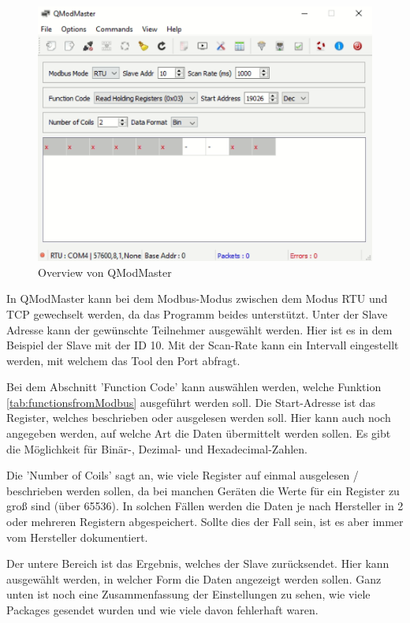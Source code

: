\begin{figure}[h t]
\centering
\includegraphics[scale=0.7]{pics/QmodMasterverview.png}
\caption{Overview von QModMaster }
\label{fig:impl:QmodMasterverview}
\end{figure}



In QModMaster kann bei dem Modbus-Modus zwischen dem Modus RTU und TCP gewechselt werden, da das Programm beides unterstützt. Unter der Slave Adresse kann der gewünschte Teilnehmer ausgewählt werden. Hier ist es in dem Beispiel der Slave mit der ID 10. Mit der Scan-Rate kann ein Intervall eingestellt werden, mit welchem das Tool den Port abfragt.


Bei dem Abschnitt 'Function Code' kann auswählen werden, welche Funktion \ref{tab:functionsfromModbus} ausgeführt werden soll. Die Start-Adresse ist das Register, welches beschrieben oder ausgelesen werden soll. Hier kann auch noch angegeben werden, auf welche Art die Daten übermittelt werden sollen. Es gibt die Möglichkeit für Binär-, Dezimal- und Hexadecimal-Zahlen.


Die 'Number of Coils' sagt an, wie viele Register auf einmal ausgelesen / beschrieben werden sollen, da bei manchen Geräten die Werte für ein Register zu groß sind (über 65536). In solchen Fällen werden die Daten je nach Hersteller in 2 oder mehreren Registern abgespeichert. Sollte dies der Fall sein, ist es aber immer vom Hersteller dokumentiert.



Der untere Bereich ist das Ergebnis, welches der Slave zurücksendet. Hier kann ausgewählt werden, in welcher Form die Daten angezeigt werden sollen. Ganz unten ist noch eine Zusammenfassung der Einstellungen zu sehen, wie viele Packages gesendet wurden und wie viele davon fehlerhaft waren.


